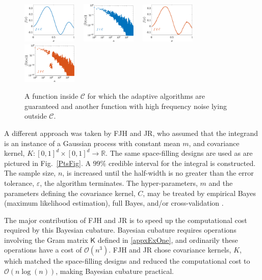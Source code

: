 \documentclass[11pt]{NSFamsart}
\newcommand{\reals}{{\mathbb{R}}}
\newcommand{\mK}{\mathsf{K}}
\newcommand{\cc}{\mathcal{C}}
\newcommand{\Order}{\mathcal{O}}
\begin{document}
\begin{figure}[ht]
	\centering
	\includegraphics[width = 0.23\textwidth] 
	{ProgramsImages/FunctionWalshFourierCoeffDecay.eps} \ \ 
	\includegraphics[width = 0.23\textwidth] 
	{ProgramsImages/WalshFourierCoeffDecay128.eps} \ \ 
	\includegraphics[width = 0.23\textwidth] 
	{ProgramsImages/FilteredFunctionWalshFourierCoeffDecay.eps} \ \ 
	\includegraphics[width = 0.23\textwidth] 
	{ProgramsImages/WalshFourierCoeffDecayFilter.eps}
	\caption{A function inside $\cc$ for which the adaptive algorithms are guaranteed and another function with high frequency noise lying outside $\cc$.
	\label{GoodBadWalshFig}}
\end{figure}

A different approach was taken by FJH and JR, who assumed that the integrand is an instance of a Gaussian process with constant mean $m$, and covariance kernel, $K:[0,1]^d \times [0,1]^d \to \reals$.  The same space-filling designs are used as are pictured in Fig.\ \ref{PtsFig}.  A $99\%$ credible interval for the integral is constructed.  The sample size, $n$, is increased until the half-width is no greater than the error tolerance, $\varepsilon$, the algorithm terminates.  The hyper-parameters, $m$ and the parameters defining the covariance kernel, $C$, may be treated by empirical Bayes (maximum likelihood estimation), full Bayes, and/or cross-validation \cite{RatHic19a}. 

The major contribution of FJH and JR is to speed up the computational cost required by this Bayesian cubature.  Bayesian cubature requires operations
involving the Gram matrix $\mK$ defined in \eqref{appxExOne}, and ordinarily these operations  have a cost of
$\Order(n^3)$.  FJH and JR chose covariance kernels, $K$, which matched the space-filling designs and reduced the computational cost to $\Order(n 
\log(n))$, making Bayesian cubature practical.
\end{document}
